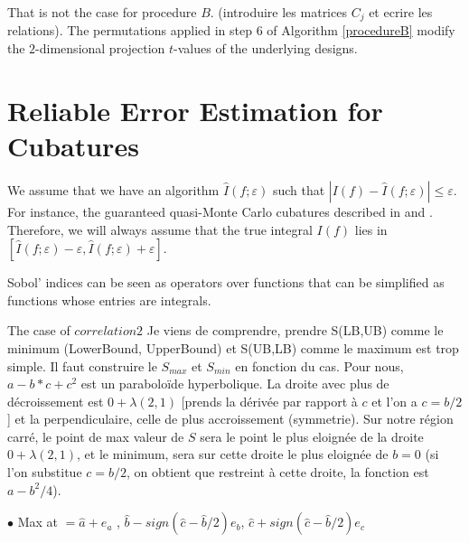 \documentclass[]{elsarticle}
\theoremstyle{definition}
\def\abs#1{\ensuremath{\left \lvert #1 \right \rvert}}
\begin{document}
That is not the case for procedure $B$. (introduire les matrices $C_j$ et ecrire les relations). The permutations applied in step $6$ of Algorithm \ref{procedureB} modify the $2$-dimensional projection $t$-values of the underlying designs. 



\section{Reliable Error Estimation for Cubatures}
\label{section.error} 
We assume that we have an algorithm $\widehat{I}(f;\varepsilon)$ such that $\abs{I(f)-\widehat{I}(f;\varepsilon)}\leq \varepsilon$. For instance, the guaranteed quasi-Monte Carlo cubatures described in \cite{-} and \cite{-}. Therefore, we will always assume that the true integral $I(f)$ lies in $[\widehat{I}(f;\varepsilon)-\varepsilon,\widehat{I}(f;\varepsilon)+\varepsilon]$.

Sobol' indices can be seen as operators over functions that can be simplified as functions whose entries are integrals.

The case of $correlation 2$
Je viens de comprendre, prendre S(LB,UB) comme le minimum (LowerBound, UpperBound) et S(UB,LB) comme le maximum est trop simple. Il faut construire le $S_{max}$ et $S_{min}$ en fonction du cas.
Pour nous, $a - b*c + c^2$ est un paraboloïde hyperbolique. La droite avec plus de décroissement est $0+\lambda(2,1)$ [prends la dérivée par rapport à $c$ et l'on a $c=b/2$] et la perpendiculaire, celle de plus accroissement (symmetrie). Sur notre région carré, le point de max valeur de $S$ sera le point le plus eloignée de la droite $0+\lambda(2,1)$, et le minimum, sera sur cette droite le plus eloignée de $b = 0$ (si l'on substitue $c=b/2$, on obtient que restreint à cette droite, la fonction est $a-b^2/4$).

$\bullet$ Max at $= \hat{a} + e_a$  ,  $\hat{b} - sign(\hat{c}-\hat{b}/2) e_b$,  $\hat{c} + sign(\hat{c}-\hat{b}/2) e_c$
\end{document}
